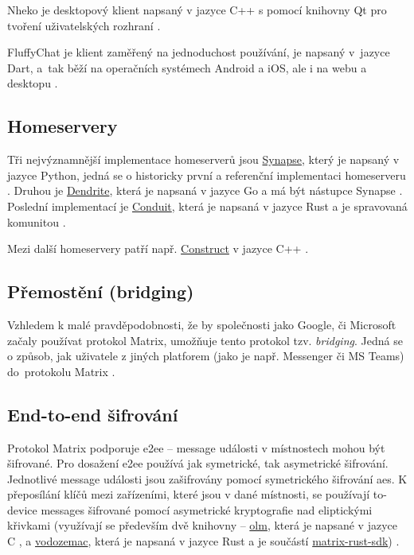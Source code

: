 Nheko je desktopový klient napsaný v jazyce C++ s pomocí knihovny Qt pro tvoření
uživatelských rozhraní \parencite{GitHub-Nheko}.

FluffyChat je klient zaměřený na jednoduchost používání, je napsaný v~jazyce
Dart, a~tak běží na operačních systémech Android a iOS, ale i na webu a desktopu
\parencite{FluffyChat-Homepage,GitLab-FluffyChat}.

\subsection{Homeservery}

Tři nejvýznamnější implementace homeserverů jsou
\href{https://github.com/matrix-org/synapse/}{Synapse}, který je napsaný v
jazyce Python, jedná se o historicky první a referenční implementaci homeserveru
\parencite{GitHub-Synapse}. Druhou je
\href{https://github.com/matrix-org/dendrite/}{Dendrite}, která je napsaná v
jazyce Go a má být nástupce Synapse \parencite{GitHub-Dendrite}. Poslední
implementací je \href{https://github.com/timokoesters/conduit}{Conduit}, která
je napsaná v jazyce Rust a je spravovaná komunitou \parencite{GitHub-Conduit}.

Mezi další homeservery patří např.
\href{https://github.com/matrix-construct/construct}{Construct} v jazyce C++
\parencite{GitHub-Construct}.

\subsection{Přemostění (bridging)}

Vzhledem k malé pravděpodobnosti, že by společnosti jako Google, či Microsoft
začaly používat protokol Matrix, umožňuje tento protokol tzv. \textit{bridging}.
Jedná se o způsob, jak  uživatele z jiných platforem (jako je
např. Messenger či MS Teams) do~protokolu Matrix \parencite{MatrixORG-Bridges}.

\subsection{End-to-end šifrování}\label{matrix-encryption}

Protokol Matrix podporuje \gls{e2ee} -- message události v místnostech mohou být
šifrované. Pro dosažení \gls{e2ee} používá jak symetrické, tak asymetrické
šifrování. Jednotlivé message události jsou zašifrovány pomocí symetrického
šifrování \gls{aes}. K přeposílání klíčů mezi zařízeními, které jsou v dané
místnosti, se používají to-device messages šifrované pomocí asymetrické
kryptografie nad eliptickými křivkami (využívají se především dvě knihovny --
\href{https://gitlab.matrix.org/matrix-org/olm}{olm}, která je napsané v jazyce
C \parencite{GitLab-Olm}, a
\href{https://github.com/matrix-org/vodozemac}{vodozemac}, která je napsaná v
jazyce Rust a je součástí
\href{https://github.com/matrix-org/matrix-rust-sdk}{matrix-rust-sdk})
\parencite{GitHub-MatrixRustSDK}.

